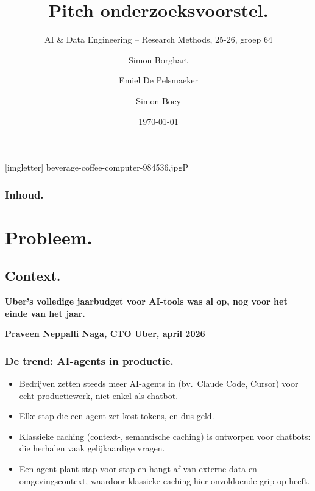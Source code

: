 \documentclass[aspectratio=169]{beamer}
\title{Pitch onderzoeksvoorstel.}
\subtitle{AI \& Data Engineering -- Research Methods, 25-26, groep 64}
\author{Simon Borghart \and Emiel De Pelsmaeker \and Simon Boey}
\date{\today}
\begin{document}
{
    [imgletter]
        {beverage-coffee-computer-984536.jpg}{P}

    \begin{frame}
        \maketitle
    \end{frame}
}

\begin{frame}
    \frametitle{Inhoud.}

    \tableofcontents
\end{frame}


\section{Probleem.}

\subsection{Context.}

{

\begin{frame}

    {\huge \textbf{Uber's volledige jaarbudget voor AI-tools was al op,
    nog voor het einde van het jaar.}}

    \bigskip

    \textbf{Praveen Neppalli Naga, CTO Uber, april 2026}

\end{frame}
}

\begin{frame}
    \frametitle{De trend: AI-agents in productie.}

    \begin{itemize}
        \item Bedrijven zetten steeds meer AI-agents in (bv.\ Claude Code,
            Cursor) voor echt productiewerk, niet enkel als chatbot.
        \item Elke stap die een agent zet kost tokens, en dus geld.
        \item Klassieke caching (context-, semantische caching) is
            ontworpen voor chatbots: die herhalen vaak gelijkaardige
            vragen.
        \item Een agent plant stap voor stap en hangt af van externe
            data en omgevingscontext, waardoor klassieke caching hier
            onvoldoende grip op heeft.
    \end{itemize}
\end{frame}
\end{document}
